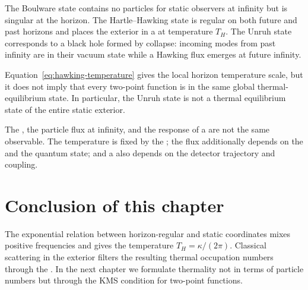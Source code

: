 The Boulware state contains no particles for static observers at infinity but is singular at the horizon. The Hartle--Hawking state is regular on both future and past horizons and places the exterior in a  at temperature $T_H$. The Unruh state corresponds to a black hole formed by collapse: incoming modes from past infinity are in their vacuum state while a Hawking flux emerges at future infinity.

Equation~\eqref{eq:hawking-temperature} gives the local horizon temperature scale, but it does not imply that every two-point function is in the same global thermal-equilibrium state. In particular, the Unruh state is not a thermal equilibrium state of the entire static exterior.

\begin{warningbox}
The , the particle flux at infinity, and the response of a  are not the same observable. The temperature is fixed by the ; the flux additionally depends on the  and the quantum state; and a  also depends on the detector trajectory and coupling.
\end{warningbox}

\section{Conclusion of this chapter}

The exponential relation between horizon-regular and static coordinates mixes positive frequencies and gives the temperature $T_H=\kappa/(2\pi)$. Classical scattering in the exterior filters the resulting thermal occupation numbers through the . In the next chapter we formulate thermality not in terms of particle numbers but through the KMS condition for two-point functions.

